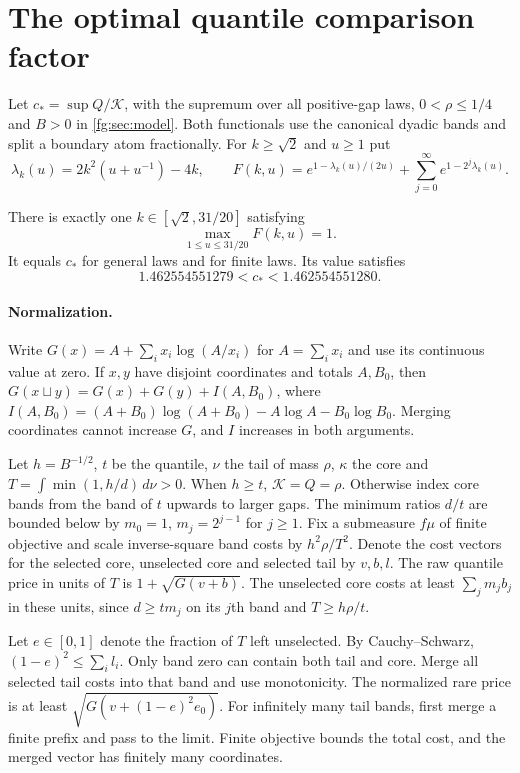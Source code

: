 \section{The optimal quantile comparison factor}\label{app:optimal-quantile-factor}
Let $c_*=\sup Q/\mathcal K$, with the supremum over all positive-gap laws,
$0<\rho\le1/4$ and $B>0$ in \cref{fg:sec:model}. Both functionals use the
canonical dyadic bands and split a boundary atom fractionally.
For $k\ge\sqrt2$ and $u\ge1$ put
\[
 \lambda_k(u)=2k^2(u+u^{-1})-4k,\qquad
 F(k,u)=e^{1-\lambda_k(u)/(2u)}+
             \sum_{j=0}^{\infty}e^{1-2^j\lambda_k(u)} .
\]

\begin{theorem}\label{thm:sharp-quantile-factor}
There is exactly one $k\in[\sqrt2,31/20]$ satisfying
\[
 \max_{1\le u\le31/20} F(k,u)=1.
\]
It equals $c_*$ for general laws and for finite laws. Its value satisfies
\[
 1.462554551279<c_*<1.462554551280 .
\]
\end{theorem}

\paragraph{Normalization.}
Write $G(x)=A+\sum_i x_i\log(A/x_i)$ for $A=\sum_i x_i$ and use its
continuous value at zero. If $x,y$ have disjoint coordinates and totals
$A,B_0$, then $G(x\sqcup y)=G(x)+G(y)+I(A,B_0)$, where
$I(A,B_0)=(A+B_0)\log(A+B_0)-A\log A-B_0\log B_0$.
Merging coordinates cannot increase $G$, and $I$ increases in both arguments.

Let $h=B^{-1/2}$, $t$ be the quantile, $\nu$ the tail of mass $\rho$,
$\kappa$ the core and $T=\int\min(1,h/d)\,d\nu>0$.
When $h\ge t$, $\mathcal K=Q=\rho$. Otherwise index core bands from the
band of $t$ upwards to larger gaps. The minimum ratios $d/t$ are bounded
below by $m_0=1$, $m_j=2^{j-1}$ for $j\ge1$.
Fix a submeasure $f\mu$ of finite objective and scale inverse-square
band costs by $h^2\rho/T^2$. Denote the cost vectors for the selected
core, unselected core and selected tail by $v,b,l$. The raw quantile
price in units of $T$ is $1+\sqrt{G(v+b)}$. The unselected core costs
at least $\sum_j m_j b_j$ in these units, since $d\ge tm_j$ on its
$j$th band and $T\ge h\rho/t$.

Let $e\in[0,1]$ denote the fraction of $T$ left unselected. By
Cauchy--Schwarz, $(1-e)^2\le\sum_i l_i$. Only band zero can contain
both tail and core. Merge all selected tail costs into that band and
use monotonicity. The normalized rare price is at least
$\sqrt{G(v+(1-e)^2e_0)}$. For infinitely many tail bands, first merge
a finite prefix and pass to the limit. Finite objective bounds the total
cost, and the merged vector has finitely many coordinates.

